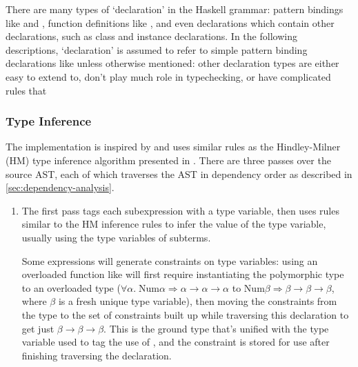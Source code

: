 \documentclass[dissertation.tex]{subfiles}
\begin{document}
{{        

        There are many types of `declaration' in the Haskell grammar: pattern bindings like  and
        , function definitions like , and even declarations
        which contain other declarations, such as class and instance declarations. In the following descriptions,
        `declaration' is assumed to refer to simple pattern binding declarations like  unless otherwise
        mentioned: other declaration types are either easy to extend to, don't play much role in typechecking, or have
        complicated rules that 


        \subsubsection{Type Inference}
        {


            The implementation is inspired by \cite{THIH} and uses similar rules as the Hindley-Milner (HM) type
            inference algorithm presented in \cite{HM-rules}. There are three passes over the source AST, each of which
            traverses the AST in dependency order as described in \ref{sec:dependency-analysis}.

            \begin{enumerate}
            \item
            {
                
                The first pass tags each subexpression with a type variable, then uses rules similar to the HM inference
                rules to infer the value of the type variable, usually using the type variables of subterms.
                
                Some expressions will generate constraints on type variables: using an overloaded function like
                \haskell{(+)} will first require instantiating the polymorphic type to an overloaded type
                (\(\forall\alpha.\;\text{Num}\alpha\Rightarrow\alpha\rightarrow\alpha\rightarrow\alpha\) to
                \(\text{Num}\beta\Rightarrow\beta\rightarrow\beta\rightarrow\beta\), where \(\beta\) is a fresh unique
                type variable), then moving the constraints from the type to the set of constraints built up while
                traversing this declaration to get just \(\beta\rightarrow\beta\rightarrow\beta\). This is the ground
                type that's unified with the type variable used to tag the use of \haskell{(+)}, and the constraint is
                stored for use after finishing traversing the declaration.

}
\end{enumerate}}}}
\end{document}
